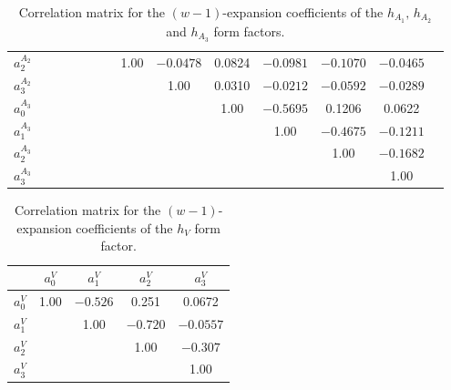\documentclass[aps,superscriptaddress,showpacs,nofootinbib,11pt]{revtex4-1}
\newcommand\tstrut{\rule{0pt}{2.9ex}}       %
\begin{document}
\begin{table}[h]
\begin{ruledtabular}
\begin{center}
\begin{tabular}{cccccccccccccc}
$a_2^{{A_2}}$&   &&&&&&1.00&  $-0.0478$ &  \hspace{.25cm}0.0824 & $-0.0981$&  $-0.1070$ & $-0.0465$\\
$a_3^{{A_2}}$& &&&&&&&   1.00 &  \hspace{.25cm}0.0310 & $-0.0212$&  $-0.0592$ & $-0.0289$ \\
$a_0^{{A_3}}$& &&&&&&&&  1.00 & $-0.5695$&   \hspace{.25cm}0.1206 &  \hspace{.25cm}0.0622 \\
$a_1^{{A_3}}$&  &&&&&&&&&  1.00&  $-0.4675$ & $-0.1211$\\
$a_2^{{A_3}}$&  &&&&&&&&&&   1.00 & $-0.1682$\\
$a_3^{{A_3}}$&  &&&&&&&&&&&  1.00\\

\end{tabular}
    \caption{Correlation matrix for the $(w-1)$-expansion coefficients of   the $h_{A_1},\,h_{A_2}$ and $h_{A_3}$ form factors. }
   \label{tab:ha123}
   \end{center}
   \end{ruledtabular}
\end{table}
%
%
\begin{table}[h]
\begin{ruledtabular}
\begin{center}
\begin{tabular}{ccccc}
 & $a_0^{{V}}$&$a_1^{{V}}$&$a_2^{{V}}$&$a_3^{{V}}$\\ \hline \tstrut
 $a_0^{{V}}$ &1.00&  $-0.526$&   \hspace{.25cm}0.251  & \hspace{.25cm}0.0672\\
 $a_1^{{V}}$ &&   1.00&  $-0.720$&  $-0.0557$\\
 $a_2^{{V}}$ &&&  1.00 & $-0.307$\\
 $a_3^{{V}}$ &&&&   1.00\\
\end{tabular}
    \caption{Correlation matrix for the $(w-1)$-expansion coefficients of the $h_{V}$ form factor. }
   \label{tab:hvhv}
   \end{center}
   \end{ruledtabular}
\end{table}
%
%
\end{document}
